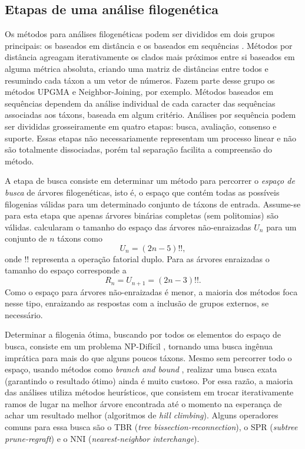 \documentclass[12pt]{article}
\begin{document}
\subsection{Etapas de uma análise filogenética}

Os métodos para análises filogenéticas podem ser divididos em dois grupos principais: os baseados em distância e os baseados em sequências \cite{cotta2002inferring}. Métodos por distância agreagam iterativamente os clados mais próximos entre si baseados em alguma métrica absoluta, criando uma matriz de distâncias entre todos e resumindo cada táxon a um vetor de números. Fazem parte desse grupo os métodos UPGMA e Neighbor-Joining, por exemplo. Métodos baseados em sequências dependem da análise individual de cada caracter das sequências associadas aos táxons, baseada em algum critério. Análises por sequência podem ser divididas grosseiramente em quatro etapas: busca, avaliação, consenso e suporte. Essas etapas não necessariamente representam um processo linear e não são totalmente dissociadas, porém tal separação facilita a compreensão do método.

A etapa de busca consiste em determinar um método para percorrer o \emph{espaço de busca} de árvores filogenéticas, isto é, o espaço que contém todas as possíveis filogenias válidas para um determinado conjunto de táxons de entrada. Assume-se para esta etapa que apenas árvores binárias completas (sem politomias) são válidas. \cite{cavalli1967phylogenetic} calcularam o  tamanho do espaço das árvores não-enraizadas $U_n$ para um conjunto de $n$ táxons como
\begin{equation}
  U_n = (2n-5)!!,
\end{equation}
onde $!!$ representa a operação fatorial duplo. Para as árvores enraizadas o tamanho do espaço corresponde a 
\begin{equation}
  R_n = U_{n+1} = (2n-3)!!.
\end{equation}
Como o espaço para árvores não-enraizadas é menor, a maioria dos métodos foca nesse tipo, enraizando as respostas com a inclusão de grupos externos, se necessário.

Determinar a filogenia ótima, buscando por todos os elementos do espaço de busca, consiste em um problema NP-Difícil \cite{np-hardness}, tornando uma busca ingênua imprática para mais do que alguns poucos táxons. Mesmo sem percorrer todo o espaço, usando métodos como \emph{branch and bound} \cite{branch-and-bound}, realizar uma busca exata (garantindo o resultado ótimo) ainda é muito custoso. Por essa razão, a maioria das análises utiliza métodos heurísticos, que consistem em trocar iterativamente ramos de lugar na melhor árvore encontrada até o momento na esperança de achar um resultado melhor (algoritmos de \emph{hill climbing}). Alguns operadores comuns para essa busca são o TBR (\emph{tree bissection-reconnection}), o SPR (\emph{subtree prune-regraft}) e o NNI (\emph{nearest-neighbor interchange}).
\end{document}
